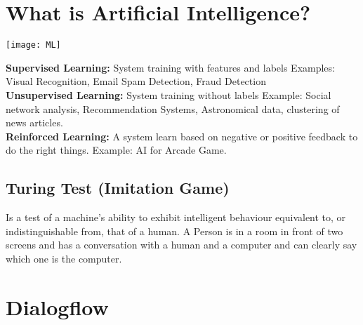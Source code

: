 \section{What is Artificial Intelligence?}

\begin{minipage}{0,5\linewidth}
	\texttt{[image: ML]}
\end{minipage}
\begin{minipage}{0,5\linewidth}
\textbf{Supervised Learning:} System training with features and labels Examples: Visual Recognition, Email Spam Detection, Fraud Detection \\
\textbf{Unsupervised Learning:} System training without labels Example: Social network analysis, Recommendation Systems, Astronomical data, clustering of news articles. \\
\textbf{Reinforced Learning:} A system learn based on negative or positive feedback to do the right things. Example: AI for Arcade Game. \\
\end{minipage}

\subsection{Turing Test (Imitation Game)}
Is a test of a machine's ability to exhibit intelligent behaviour equivalent to, or indistinguishable from, that of a human. A Person is in a room in front of two screens and has a conversation with a human and a computer and can clearly say which one is the computer.
\section{Dialogflow}


